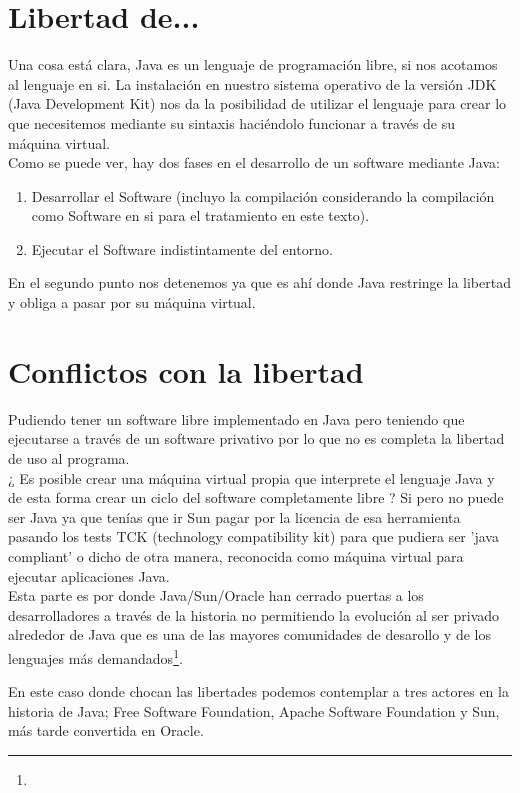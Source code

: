 \documentclass[11pt]{scrartcl}
\begin{document}
\section{Libertad de...}

Una cosa está clara, Java es un lenguaje de programación libre, si nos acotamos al lenguaje en si. La instalación en nuestro sistema operativo de la versión JDK (Java Development Kit) nos da la posibilidad de utilizar el lenguaje para crear lo que necesitemos mediante su sintaxis haciéndolo funcionar a través de su máquina virtual.\\
Como se puede ver, hay dos fases en el desarrollo de un software mediante Java:
\begin{enumerate}
\item Desarrollar el Software (incluyo la compilación considerando la compilación como Software en si para el tratamiento en este texto).
\item Ejecutar el Software indistintamente del entorno.
\end{enumerate}

En el segundo punto nos detenemos ya que es ahí donde Java restringe la libertad y obliga a pasar por su máquina virtual.

\section{Conflictos con la libertad}

Pudiendo tener un software libre implementado en Java pero teniendo que ejecutarse a través de un software privativo por lo que no es completa la libertad de uso al programa.\\
¿ Es posible crear una máquina virtual propia que interprete el lenguaje Java y de esta forma crear un ciclo del software completamente libre ? Si pero no puede ser Java ya que tenías que ir Sun pagar por la licencia de esa herramienta pasando los tests TCK (technology compatibility kit) para que pudiera ser 'java compliant' o dicho de otra manera, reconocida como máquina virtual para ejecutar aplicaciones Java.\\
Esta parte es por donde Java/Sun/Oracle han cerrado puertas a los desarrolladores a través de la historia no permitiendo la evolución al ser privado alrededor de Java que es una de las mayores comunidades de desarollo y de los lenguajes más demandados\footnote{}.%

En este caso donde chocan las libertades podemos contemplar a tres actores en la historia de Java; Free Software Foundation, Apache Software Foundation y Sun, más tarde convertida en Oracle.
\end{document}
